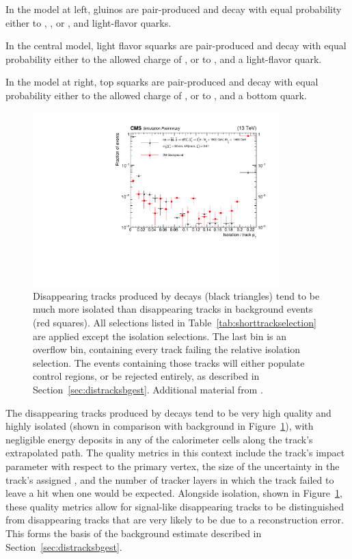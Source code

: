   In the model at left, gluinos are pair-produced and decay with equal probability either to \chip, \chim, or \lsp, and light-flavor quarks.

  In the central model, light flavor squarks are pair-produced and decay with equal probability either to the allowed charge of \chargino, or to \lsp, and a light-flavor quark.

  In the model at right, top squarks are pair-produced and decay with equal probability either to the allowed charge of \chargino, or to \lsp, and a bottom quark.

  \begin{figure}[h!]
    \centering
    \includegraphics[width=0.85\textwidth]{figures/reliso_SvsB.pdf}
    \caption[Comparison of signal and background Short Track relative isolation distributions.]
            {Disappearing tracks produced by \chargino decays (black triangles) tend to be much more isolated than disappearing tracks in background events (red squares).
              All selections listed in Table~\ref{tab:shorttrackselection} are applied except the isolation selections.
              The last bin is an overflow bin, containing every track failing the relative isolation selection.
              The events containing those tracks will either populate control regions, or be rejected entirely, as described in Section~\ref{sec:distracksbgest}.
              Additional material from \cite{MT2_2019}.}
            \label{fig:distracksisolation}
  \end{figure}  

  The disappearing tracks produced by \chargino decays tend to be very high quality and highly isolated (shown in comparison with background in Figure~\ref{fig:distracksisolation}), with negligible energy deposits in any of the calorimeter cells along the track's extrapolated path.
  The quality metrics in this context include the track's impact parameter with respect to the primary vertex, the size of the uncertainty in the track's assigned \pt, and the number of tracker layers in which the track failed to leave a hit when one would be expected.
  Alongside isolation, shown in Figure~\ref{fig:distracksisolation}, these quality metrics allow for signal-like disappearing tracks to be distinguished from disappearing tracks that are very likely to be due to a reconstruction error.
  This forms the basis of the background estimate described in Section~\ref{sec:distracksbgest}.

